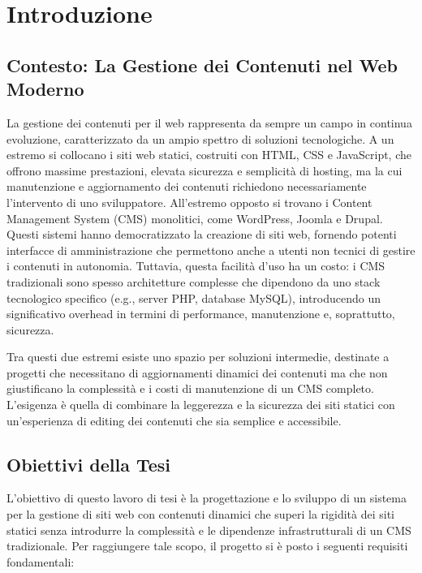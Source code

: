 \chapter{Introduzione}
\label{chap:introduzione}

\section{Contesto: La Gestione dei Contenuti nel Web Moderno}
La gestione dei contenuti per il web rappresenta da sempre un campo in continua evoluzione, caratterizzato da un ampio spettro di soluzioni tecnologiche. A un estremo si collocano i siti web statici, costruiti con HTML, CSS e JavaScript, che offrono massime prestazioni, elevata sicurezza e semplicità di hosting, ma la cui manutenzione e aggiornamento dei contenuti richiedono necessariamente l'intervento di uno sviluppatore. All'estremo opposto si trovano i Content Management System (CMS) monolitici, come WordPress, Joomla e Drupal. Questi sistemi hanno democratizzato la creazione di siti web, fornendo potenti interfacce di amministrazione che permettono anche a utenti non tecnici di gestire i contenuti in autonomia. Tuttavia, questa facilità d'uso ha un costo: i CMS tradizionali sono spesso architetture complesse che dipendono da uno stack tecnologico specifico (e.g., server PHP, database MySQL), introducendo un significativo overhead in termini di performance, manutenzione e, soprattutto, sicurezza.

Tra questi due estremi esiste uno spazio per soluzioni intermedie, destinate a progetti che necessitano di aggiornamenti dinamici dei contenuti ma che non giustificano la complessità e i costi di manutenzione di un CMS completo. L'esigenza è quella di combinare la leggerezza e la sicurezza dei siti statici con un'esperienza di editing dei contenuti che sia semplice e accessibile.

\section{Obiettivi della Tesi}
L'obiettivo di questo lavoro di tesi è la progettazione e lo sviluppo di un sistema per la gestione di siti web con contenuti dinamici che superi la rigidità dei siti statici senza introdurre la complessità e le dipendenze infrastrutturali di un CMS tradizionale. Per raggiungere tale scopo, il progetto si è posto i seguenti requisiti fondamentali:

